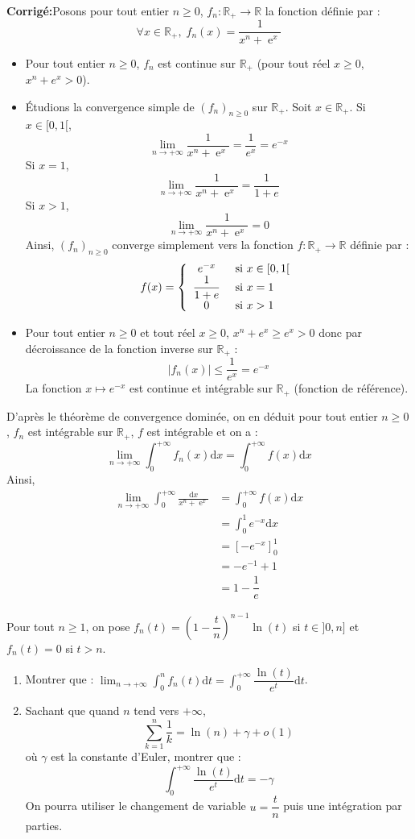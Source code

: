 \documentclass[a4paper,twoside,french,10pt]{VcCours}
\newcommand{\dx}{\text{d}x}
\newcommand{\dt}{\text{d}t}
\DeclareMathOperator{\e}{e}
\newcommand{\corr}{\textbf{Corrigé:}}
\begin{document}
 \corr Posons pour tout entier $n \geq 0$, $f_n : \mathbb{R}_+ \rightarrow \mathbb{R}$ la fonction définie par :
 $$ \forall x \in \mathbb{R}_+, \; f_n(x) = \frac{1}{x^{n} + \e^{x}}$$
 
 \begin{itemize}
 \item Pour tout entier $n \geq 0$, $f_n$ est continue sur $\mathbb{R}_+$ (pour tout réel $x \geq 0$, $x^n+e^x>0$).
 \item Étudions la convergence simple de $(f_n)_{n \geq 0}$ sur $\mathbb{R}_+$. Soit $x \in \mathbb{R}_+$. Si $x \in [0,1[$,
 $$ \lim_{n \rightarrow + \infty} \frac{1}{x^{n} + \e^{x}} = \dfrac{1}{e^x} = e^{-x}$$
 Si $x=1$,
 $$ \lim_{n \rightarrow + \infty} \frac{1}{x^{n} + \e^{x}} = \dfrac{1}{1+e}$$
 Si $x>1$,
 $$  \lim_{n \rightarrow + \infty} \frac{1}{x^{n} + \e^{x}} = 0$$
 Ainsi, $(f_n)_{n \geq 0}$ converge simplement vers la fonction $f: \mathbb{R}_+ \rightarrow \mathbb{R}$ définie par :
 $$ f(x) = \left\lbrace \begin{array}{cl}
 e^{-x} & \hbox{ si } x \in [0,1[ \\
  \dfrac{1}{1+e} & \hbox{ si } x = 1 \\
  0 & \hbox{ si } x>1
 \end{array}\right.$$
 \item Pour tout entier $n \geq 0$ et tout réel $x \geq 0$, $x^n+e^x \geq e^x>0$ donc par décroissance de la fonction inverse sur $\mathbb{R}_+$ :
 $$ \vert f_n(x) \vert \leq \dfrac{1}{e^x}=e^{-x}$$
La fonction $x \mapsto e^{-x}$ est continue et intégrable sur $\mathbb{R}_+$ (fonction de référence).
 \end{itemize}
D'après le théorème de convergence dominée, on en déduit pour tout entier $n \geq 0$, $f_n$ est intégrable sur $\mathbb{R}_+$, $f$ est intégrable et on a :
$$ \lim_{n \rightarrow + \infty} \int_0^{+ \infty} f_n(x) \dx = \int_0^{+ \infty} f(x) \dx$$
Ainsi,
\begin{align*}
\lim_{n \rightarrow + \infty} \int_{0}^{ + \infty} \frac{\dx}{x^{n} + \e^{x}} & = \int_0^{+ \infty} f(x) \dx \\
& = \int_0^1 e^{-x} \dx \\
& = \left[ -e^{-x} \right]_0^1 \\
& = -e^{-1}+ 1 \\
& = 1 - \dfrac{1}{e}
\end{align*}

\begin{Exercice}{}
Pour tout $n \geq 1$, on pose $f_n(t) = \left( 1 - \dfrac{t}{n} \right)^{n-1}\ln(t)$ si $t \in ]0,n]$ et $f_n(t)=0$ si $t>n$.
\begin{enumerate}
\item Montrer que : $\lim_{n \rightarrow + \infty} \int_{0}^n f_n(t) \dt = \int_{0}^{+ \infty} \dfrac{\ln(t)}{e^t} \dt$.
\item Sachant que quand $n$ tend vers $+ \infty$,
$$ \sum_{k=1}^n \dfrac{1}{k} = \ln(n)+ \gamma + o(1)$$
où $\gamma$ est la constante d'Euler, montrer que :
$$ \int_{0}^{+ \infty} \dfrac{\ln(t)}{e^t} \dt = - \gamma$$
On pourra utiliser le changement de variable $u=\dfrac{t}{n}$ puis une intégration par parties.
\end{enumerate}
\end{Exercice}
\end{document}
